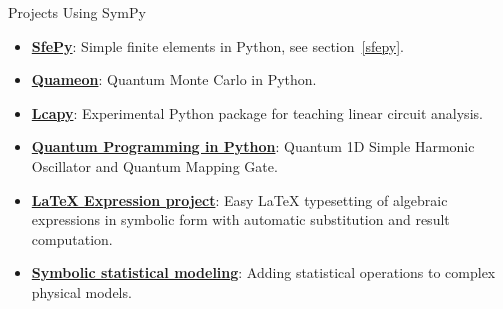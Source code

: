 \documentclass[xcolor=svgnames]{beamer}
\begin{document}
\begin{frame}{Projects Using SymPy}
\begin{itemize}
\item
  \href{http://sfepy.org/}{\textbf{SfePy}}: Simple finite elements in
  Python, see section~\ref{sfepy}.
\item
  \href{http://quameon.sourceforge.net/}{\textbf{Quameon}}: Quantum
  Monte Carlo in Python.
\item
  \href{http://lcapy.elec.canterbury.ac.nz/}{\textbf{Lcapy}}:
  Experimental Python package for teaching linear circuit analysis.
\item
  \href{http://digitalcommons.calpoly.edu/cgi/viewcontent.cgi?article=1072\&context=physsp/}{\textbf{Quantum
  Programming in Python}}: Quantum 1D Simple Harmonic Oscillator and
  Quantum Mapping Gate.
\item
  \href{http://mech.fsv.cvut.cz/~stransky/software/latexexpr/doc/}{\textbf{LaTeX
  Expression project}}: Easy \LaTeX{} typesetting of algebraic expressions
  in symbolic form with automatic substitution and result computation.
\item
  \href{https://www.researchgate.net/publication/260585491_Symbolic_Statistics_with_SymPy/}{\textbf{Symbolic
  statistical modeling}}: Adding statistical operations to complex
  physical models.
\end{itemize}
\end{frame}
\end{document}

